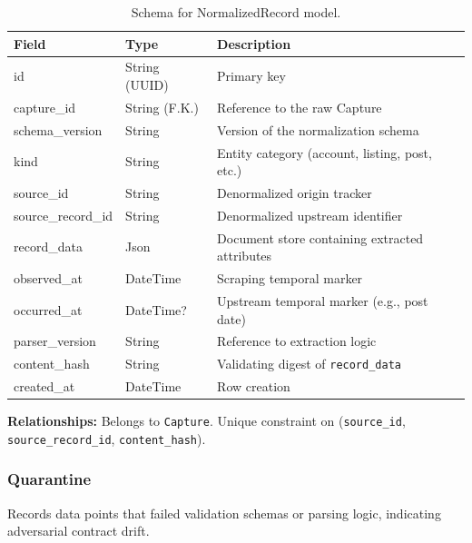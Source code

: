 \begin{table}[h]
\centering
\begin{tabular}{|l|l|l|}
\hline
\textbf{Field} & \textbf{Type} & \textbf{Description} \\
\hline
id & String (UUID) & Primary key \\
capture\_id & String (F.K.) & Reference to the raw Capture \\
schema\_version & String & Version of the normalization schema \\
kind & String & Entity category (account, listing, post, etc.) \\
source\_id & String & Denormalized origin tracker \\
source\_record\_id & String & Denormalized upstream identifier \\
record\_data & Json & Document store containing extracted attributes \\
observed\_at & DateTime & Scraping temporal marker \\
occurred\_at & DateTime? & Upstream temporal marker (e.g., post date) \\
parser\_version & String & Reference to extraction logic \\
content\_hash & String & Validating digest of \texttt{record\_data} \\
created\_at & DateTime & Row creation \\
\hline
\end{tabular}
\caption{Schema for NormalizedRecord model.}
\end{table}
\noindent \textbf{Relationships:} Belongs to \texttt{Capture}. Unique constraint on (\texttt{source\_id}, \texttt{source\_record\_id}, \texttt{content\_hash}).

\subsubsection{Quarantine}
Records data points that failed validation schemas or parsing logic, indicating adversarial contract drift.

